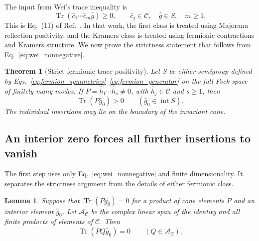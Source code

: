 \documentclass[11pt,a4paper]{article}
\newcommand{\Tr}{\operatorname{Tr}}
\newcommand{\mc}[1]{\mathcal{#1}}
\newcommand{\interior}{\operatorname{int}}
\newtheorem{theorem}{Theorem}
\newtheorem{lemma}{Lemma}
\theoremstyle{remark}
\numberwithin{equation}{section}
\begin{document}
The input from Wei's trace inequality is
\begin{equation}
\Tr(\hat c_1\cdots\hat c_m\hat g)\geq0,
\qquad \hat c_j\in\mc C,\quad \hat g\in S,
\quad m\geq1.
\label{eq:wei_nonnegative}
\end{equation}
This is Eq.~(11) of Ref.~\cite{wei2024prb}. In that work, the first class is
treated using Majorana reflection positivity, and the Kramers class is
treated using fermionic contractions and Kramers structure. We now prove the
strictness statement that follows from Eq.~\eqref{eq:wei_nonnegative}.

\begin{theorem}[Strict fermionic trace positivity]
\label{thm:fermion_strict}
Let \(S\) be either semigroup defined by
Eqs.~\eqref{eq:fermion_symmetries}--\eqref{eq:fermion_generator} on the full
Fock space of finitely many modes. If
\(P=\hat h_1\cdots\hat h_s\ne0\), with \(\hat h_j\in\mc C\) and
\(s\geq1\), then
\begin{equation}
\boxed{\Tr(P\hat g_0)>0\qquad(\hat g_0\in\interior S).}
\label{eq:fermion_strict}
\end{equation}
The individual insertions may lie on the boundary of the invariant cone.
\end{theorem}

\subsection{An interior zero forces all further insertions to vanish}

The first step uses only Eq.~\eqref{eq:wei_nonnegative} and finite
dimensionality. It separates the strictness argument from the details of
either fermionic class.

\begin{lemma}
\label{lem:interior_zero}
Suppose that \(\Tr(P\hat g_0)=0\) for a product of cone elements \(P\) and
an interior element \(\hat g_0\). Let \(\mc A_{\mc C}\) be the complex
linear span of the identity and all finite products of elements of
\(\mc C\). Then
\begin{equation}
\Tr(PQ\hat g_0)=0\qquad(Q\in\mc A_{\mc C}).
\label{eq:zero_on_algebra}
\end{equation}
\end{lemma}
\end{document}
